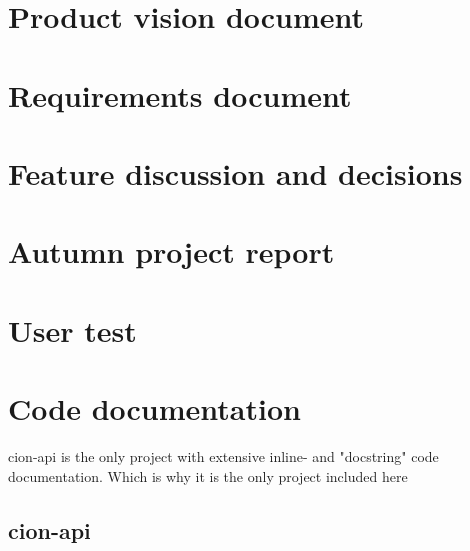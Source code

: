 \documentclass[BIND,english,oneside]{ntnuthesis/ntnubachelorthesis}
\begin{document}
\begin{appendices}

\printglossary

\chapter{Product vision document}
\label{appendix:vision}


\chapter{Requirements document}
\label{appendix:requirement}


\chapter{Feature discussion and decisions}
\label{appendix:plansndecisions}


\chapter{Autumn project report}
\label{appendix:autumn}


\chapter{User test}
\label{appendix:usertest}


\chapter{Code documentation}
cion-api is the only project with extensive inline- and "docstring" code documentation. Which is why it is the only project included here
\section{cion-api}






\end{appendices}
\end{document}
